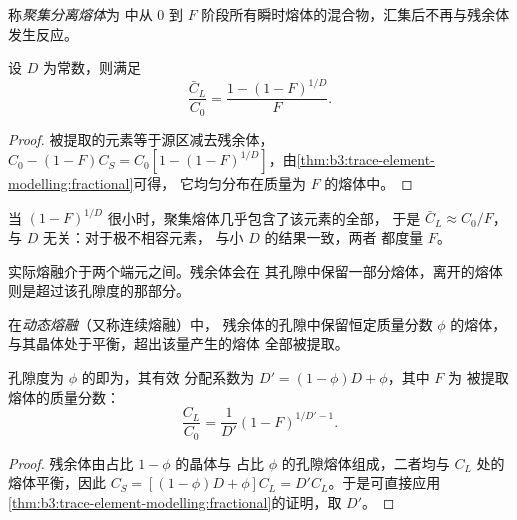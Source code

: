 \begin{definition}[聚集分离熔体]\label{def:b3:trace-element-modelling:fractional}
称\emph{聚集分离熔体}为
中从 $0$ 到
$F$ 阶段所有瞬时熔体的混合物，汇集后不再与残余体发生反应。
\end{definition}

\begin{proposition}[聚集熔体的成分]
\label{prop:b3:trace-element-modelling:aggregate}
设 $D$ 为常数，则满足
\[
\frac{\bar C_L}{C_0} = \frac{1 - (1 - F)^{1/D}}{F}.
\]
\end{proposition}

\begin{proof}
被提取的元素等于源区减去残余体，
$C_0 - (1 - F)C_S = C_0[1 - (1 - F)^{1/D}]$，由\cref{thm:b3:trace-element-modelling:fractional}可得，
它均匀分布在质量为 $F$ 的熔体中。
\end{proof}

当 $(1 - F)^{1/D}$ 很小时，聚集熔体几乎包含了该元素的全部，
于是 $\bar C_L \approx C_0/F$，与 $D$ 无关：对于极不相容元素，
与小 $D$ 的结果一致，两者
都度量 $F$。

实际熔融介于两个端元之间。残余体会在
其孔隙中保留一部分熔体，离开的熔体则是超过该孔隙度的那部分。

\begin{definition}[动态熔融]\label{def:b3:trace-element-modelling:dynamic}
在\emph{动态熔融}（又称连续熔融）中，
残余体的孔隙中保留恒定质量分数 $\phi$ 的熔体，
与其晶体处于平衡，超出该量产生的熔体
全部被提取。
\end{definition}

\begin{proposition}[动态熔融]\label{prop:b3:trace-element-modelling:dynamic}
孔隙度为 $\phi$ 的即为，其有效
分配系数为 $D' = (1 - \phi)D + \phi$，其中 $F$ 为
被提取熔体的质量分数：
\[
\frac{C_L}{C_0} = \frac{1}{D'}(1 - F)^{1/D' - 1}.
\]
\end{proposition}

\begin{proof}
残余体由占比 $1 - \phi$ 的晶体与
占比 $\phi$ 的孔隙熔体组成，二者均与 $C_L$ 处的熔体平衡，因此
$C_S = [(1 - \phi)D + \phi]C_L = D'C_L$。于是可直接应用
\cref{thm:b3:trace-element-modelling:fractional}的证明，取 $D'$。
\end{proof}

